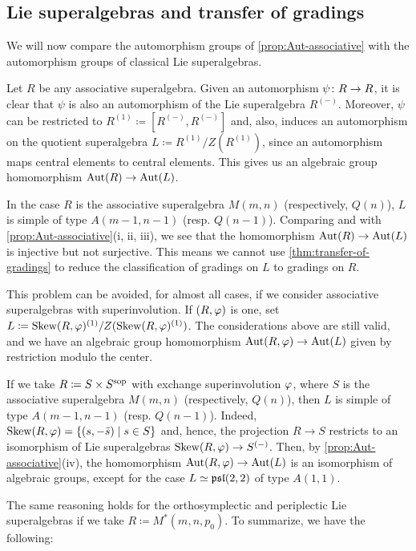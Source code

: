 \subsection{Lie superalgebras and transfer of gradings}

We will now compare the automorphism groups of \cref{prop:Aut-associative} with the automorphism groups of classical Lie superalgebras. 

Let $R$ be any associative superalgebra. 
Given an automorphism $\psi\colon R \to R$, it is clear that $\psi$ is also an automorphism of the Lie superalgebra $R^{(-)}$. 
Moreover, $\psi$ can be restricted to $R^{(1)} \coloneqq [ R^{(-)}, R^{(-)} ]$ and, also, induces an automorphism on the quotient superalgebra $L \coloneqq R^{(1)}/Z(R^{(1)})$, since an automorphism maps central elements to central elements. 
This gives us an algebraic group homomorphism $\operatorname{Aut}(R) \to \operatorname{Aut}(L)$. 

In the case $R$ is the associative superalgebra $M(m,n)$ (respectively, $Q(n)$), $L$ is simple of type $A(m-1, n-1)$ (resp. $Q(n-1)$). 
Comparing \cite[Theorem 1]{serganova} and \cite[Theorem 4.1]{Pianzola} with \cref{prop:Aut-associative}(i, ii, iii), we see that the homomorphism $\operatorname{Aut}(R) \to \operatorname{Aut}(L)$ is injective but not surjective. 
This means we cannot use \cref{thm:transfer-of-gradings} to reduce the classification of gradings on $L$ to gradings on $R$. 

This problem can be avoided, for almost all cases, if we consider associative superalgebras with superinvolution. 
If $(R, \varphi)$ is one, set $L \coloneqq \operatorname{Skew}(R, \varphi)^{(1)}/Z( \operatorname{Skew}(R, \varphi)^{(1)} )$. 
The considerations above are still valid, and we have an algebraic group homomorphism $\operatorname{Aut}(R, \varphi) \to \operatorname{Aut}(L)$ given by restriction modulo the center. 

If we take $R \coloneqq S\times S^{\mathrm{sop}}$ with exchange superinvolution $\varphi$, where $S$ is the associative superalgebra $M(m,n)$ (respectively, $Q(n)$), then $L$ %
is simple of type $A(m-1, n-1)$ (resp. $Q(n-1)$). 
Indeed, $\operatorname{Skew}(R, \varphi) = \{ (s, -\bar s) \mid s\in S \}$ and, hence, the projection $R \to S$ restricts to an isomorphism of Lie superalgebras $\operatorname{Skew}(R, \varphi) \to S^{(-)}$. 
Then, by \cref{prop:Aut-associative}(iv), the homomorphism $\operatorname{Aut}(R, \varphi) \to \operatorname{Aut}(L)$ is an isomorphism of algebraic groups, except for the case $L \simeq \mathfrak{psl}(2,2)$ of type $A(1,1)$.


The same reasoning holds for the orthosymplectic and periplectic Lie superalgebras if we take $R \coloneqq M^*(m, n, p_0)$. 
To summarize, we have the following:

